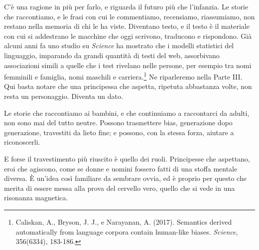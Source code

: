 C'è una ragione in più per farlo, e riguarda il futuro più che l'infanzia. Le storie che raccontiamo, e le frasi con cui le commentiamo, recensiamo, riassumiamo, non restano nella memoria di chi le ha viste. Diventano testo, e il testo è il materiale con cui si addestrano le macchine che oggi scrivono, traducono e rispondono. Già alcuni anni fa uno studio su \textit{Science} ha mostrato che i modelli statistici del linguaggio, imparando da grandi quantità di testi del web, assorbivano associazioni simili a quelle che i test rivelano nelle persone, per esempio tra nomi femminili e famiglia, nomi maschili e carriera.\footnote{Caliskan, A., Bryson, J. J., e Narayanan, A. (2017). Semantics derived automatically from language corpora contain human-like biases. \textit{Science}, 356(6334), 183-186.} Ne riparleremo nella Parte III. Qui basta notare che una principessa che aspetta, ripetuta abbastanza volte, non resta un personaggio. Diventa un dato.

Le storie che raccontiamo ai bambini, e che continuiamo a raccontarci da adulti, non sono mai del tutto neutre. Possono trasmettere bias, generazione dopo generazione, travestiti da lieto fine; e possono, con la stessa forza, aiutare a riconoscerli.

E forse il travestimento pi\`{u} riuscito \`{e} quello dei ruoli. Principesse che aspettano, eroi che agiscono, come se donne e uomini fossero fatti di una stoffa mentale diversa. \`{E} un'idea cos\`{i} familiare da sembrare ovvia, ed \`{e} proprio per questo che merita di essere messa alla prova del cervello vero, quello che si vede in una risonanza magnetica.
